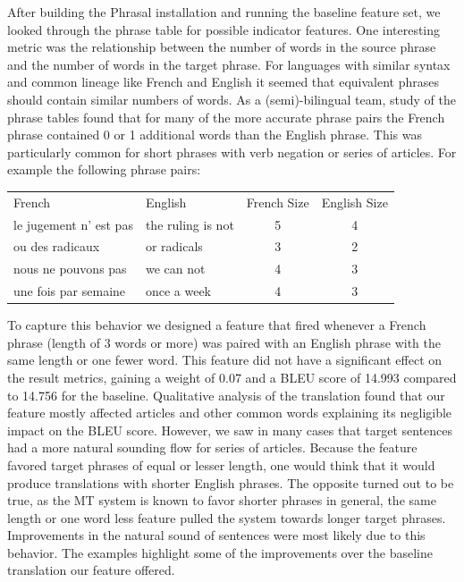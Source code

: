 \documentclass{article}
\begin{document}
After building the Phrasal installation and running the baseline feature set, we looked through the phrase table for possible indicator features. One interesting metric was the relationship between the number of words in the source phrase and the number of words in the target phrase. For languages with similar syntax and common lineage like French and English it seemed that equivalent phrases should contain similar numbers of words. As a (semi)-bilingual team, study of the phrase tables found that for many of the more accurate phrase pairs the French phrase contained 0 or 1 additional words than the English phrase. This was particularly common for short phrases with verb negation or series of articles. For example the following phrase pairs:
\begin{center}
\begin{tabular}{l l c c}
French & English & French Size & English Size \\
le jugement n' est pas & the ruling is not & 5 & 4 \\
ou des radicaux & or radicals & 3 & 2 \\
nous ne pouvons pas & we can not & 4 & 3 \\
une fois par semaine & once a week  & 4 & 3 \\
\end{tabular}
\end{center}
To capture this behavior we designed a feature that fired whenever a French phrase (length of 3 words or more) was paired with an English phrase with the same length or one fewer word. This feature did not have a significant effect on the result metrics, gaining a weight of 0.07 and a BLEU score of 14.993 compared to 14.756  for the baseline. Qualitative analysis of the translation found that our feature mostly affected articles and other common words explaining its negligible impact on the BLEU score. However, we saw in many cases that target sentences had a more natural sounding flow for series of articles. Because the feature favored target phrases of equal or lesser length, one would think that it would produce translations with shorter English phrases. The opposite turned out to be true, as the MT system is known to favor shorter phrases in general, the same length or one word less feature pulled the system towards longer target phrases. Improvements in the natural sound of sentences were most likely due to this behavior. The examples highlight some of the improvements over the baseline translation our feature offered.
\end{document}
